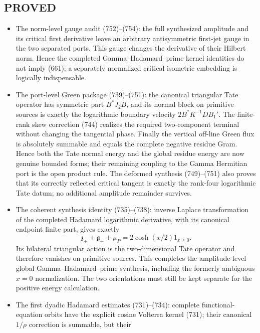 \documentclass[11pt]{article}
\begin{document}
\subsection*{PROVED}
\begin{itemize}
\item The norm-level gauge audit (752)--(754): the full synthesized
      amplitude and its critical first derivative leave an arbitrary
      antisymmetric first-jet gauge in the two separated ports.  This gauge
      changes the derivative of their Hilbert norm.  Hence the completed
      Gamma--Hadamard--prime kernel identities do not imply (661); a
      separately normalized critical isometric embedding is logically
      indispensable.
\item The port-level Green package (739)--(751): the canonical triangular
      Tate operator has symmetric part \(B^*J_2B\), and its normal block on
      primitive sources is exactly the logarithmic boundary velocity
      \(2B^*K^{-1}DB_1'\).  The finite-rank skew correction (744) realizes
      the required two-component terminal without changing the tangential
      phase.  Finally the vertical off-line Green flux is absolutely
      summable and equals the complete negative residue Gram.  Hence both
      the Tate normal energy and the global residue energy are now genuine
      bounded forms; their remaining coupling to the Gamma Hermitian port
      is the open product rule.  The deformed synthesis (749)--(751) also
      proves that its correctly reflected critical tangent is exactly the
      rank-four logarithmic Tate datum; no additional amplitude remainder
      survives.
\item The coherent synthesis identity (735)--(738): inverse Laplace
      transformation of the completed Hadamard logarithmic derivative,
      with its canonical endpoint finite part, gives exactly
      \[
      \mathfrak z_++\mathfrak g_++\mu_P
      =2\cosh(x/2)1_{x\ge0}.
      \]
      Its bilateral triangular action is the two-dimensional Tate operator
      and therefore vanishes on primitive sources.  This completes the
      amplitude-level global Gamma--Hadamard--prime synthesis, including
      the formerly ambiguous \(x=0\) normalization.  The two orientations
      must still be kept separate for the positive energy calculation.
\item The first dyadic Hadamard estimates (731)--(734): complete
      functional-equation orbits have the explicit cosine Volterra kernel
      (731); their canonical \(1/\rho\) correction is summable, but their

\end{itemize}
\end{document}

